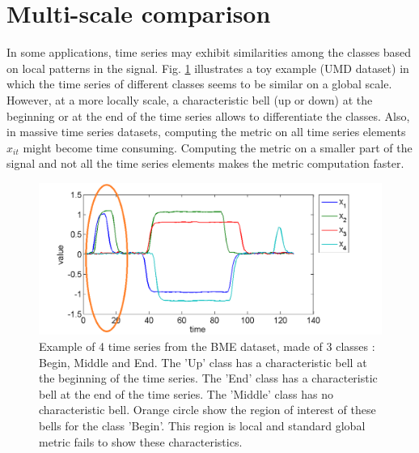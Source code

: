 \section{Multi-scale comparison}

In some applications, time series may exhibit similarities among the classes based on local patterns in the signal. Fig. \ref{fig:UMD} illustrates a toy example (UMD dataset) in which the time series of different classes seems to be similar on a global scale. However, at a more locally scale, a characteristic bell (up or down) at the beginning or at the end of the time series allows to differentiate the classes. Also, in massive time series datasets, computing the metric on all time series elements $x_{it}$ might become time consuming. Computing the metric on a smaller part of the signal and not all the time series elements makes the metric computation faster.

\begin{figure}[h!]
	\centering
	\includegraphics[width=0.8\linewidth]{images/BME_local}
	\caption{Example of 4 time series from the BME dataset, made of 3 classes : Begin, Middle and End. The 'Up' class has a characteristic bell at the beginning of the time series. The 'End' class has a characteristic bell at the end of the time series. The 'Middle' class has no characteristic bell. Orange circle show the region of interest of these bells for the class 'Begin'. This region is local and standard global metric fails to show these characteristics.}
	\label{fig:UMD}
\end{figure}

